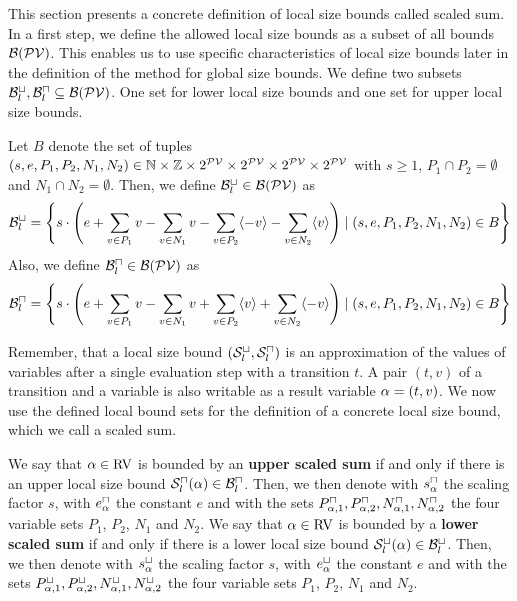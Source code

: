 This section presents a concrete definition of local size bounds called scaled sum.
In a first step, we define the allowed local size bounds as a subset of all bounds $\mathcal{B}(\mathcal{PV})$.
This enables us to use specific characteristics of local size bounds later in the definition of the method for global size bounds.
We define two subsets $\mathcal{B}^\sqcup_l, \mathcal{B}^\sqcap_l \subseteq \mathcal{B}(\mathcal{PV})$.
One set for lower local size bounds and one set for upper local size bounds.

\begin{definition}
  Let $B$ denote the set of tuples $(s,e,P_1,P_2,N_1,N_2) \in \mathbb{N} \times \mathbb{Z} \times 2^{\mathcal{PV}} \times 2^{\mathcal{PV}} \times 2^{\mathcal{PV}} \times 2^{\mathcal{PV}}$ with $s \geq 1$, $P_1 \cap P_2 = \emptyset$ and $N_1 \cap N_2 = \emptyset$.
  Then, we define $\mathcal{B}^\sqcup_l \in \mathcal{B}(\mathcal{PV})$ as 
  \[ \mathcal{B}^\sqcup_l = \left\{
    s \cdot \left(
        e
      + \sum_{v \in P_1} v
      - \sum_{v \in N_1} v
      - \sum_{v \in P_2} \langle-v\rangle
      - \sum_{v \in N_2} \langle v\rangle
      \right) \mid (s,e,P_1,P_2,N_1,N_2) \in B \right\} \]
  Also, we define $\mathcal{B}^\sqcap_l \in \mathcal{B}(\mathcal{PV})$ as 
  \[ \mathcal{B}^\sqcap_l = \left\{
    s \cdot \left(
        e
      + \sum_{v \in P_1} v
      - \sum_{v \in N_1} v
      + \sum_{v \in P_2} \langle v\rangle
      + \sum_{v \in N_2} \langle-v\rangle
      \right) \mid (s,e,P_1,P_2,N_1,N_2) \in B \right\} \]
\end{definition}

Remember, that a local size bound ${({\mathcal{S}^\sqcup_l}, {\mathcal{S}^\sqcap_l})}$ is an approximation of the values of variables after a single evaluation step with a transition $t$.
A pair $(t,v)$ of a transition and a variable is also writable as a result variable $\alpha = (t,v)$.
We now use the defined local bound sets for the definition of a concrete local size bound, which we call a scaled sum.

\begin{definition}
  We say that $\alpha \in \text{RV}$ is bounded by an \textbf{upper scaled sum} if and only if there is an upper local size bound ${\mathcal{S}^\sqcap_l}(\alpha) \in \mathcal{B}^\sqcap_l$.
  Then, we then denote with $s^\sqcap_\alpha$ the scaling factor $s$, with $e^\sqcap_\alpha$ the constant $e$ and with the sets $P_{\alpha,1}^\sqcap, P_{\alpha,2}^\sqcap, N_{\alpha,1}^\sqcap, N_{\alpha,2}^\sqcap$ the four variable sets $P_1$, $P_2$, $N_1$ and $N_2$.
  We say that $\alpha \in \text{RV}$ is bounded by a \textbf{lower scaled sum} if and only if there is a lower local size bound ${\mathcal{S}^\sqcup_l}(\alpha) \in \mathcal{B}^\sqcup_l$.
  Then, we then denote with $s^\sqcup_\alpha$ the scaling factor $s$, with $e^\sqcup_\alpha$ the constant $e$ and with the sets $P_{\alpha,1}^\sqcup, P_{\alpha,2}^\sqcup, N_{\alpha,1}^\sqcup, N_{\alpha,2}^\sqcup$ the four variable sets $P_1$, $P_2$, $N_1$ and $N_2$.
\end{definition}

